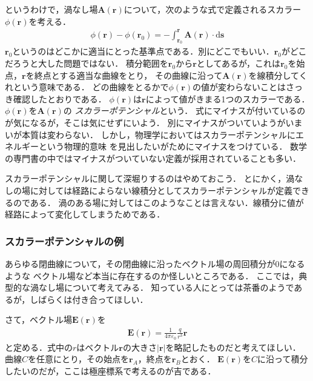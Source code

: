 というわけで，渦なし場$\bm{A}(\bm{r})$について，次のような式で定義されるスカラー$\phi(\bm{r})$を考える．
\begin{align}
\phi (\bm{r}) - \phi (\bm{r}_0 )= - \int_{\bm{r}_0}^{\bm{r}} \bm{A}(\bm{r}) \cdot \mathrm{d} \bm{s}
\label{eq:sukara}
\end{align}
$\bm{r}_0$というのはどこかに適当にとった基準点である．別にどこでもいい．$\bm{r}_0$がどこだろうと大した問題ではない．
積分範囲を$\bm{r}_0$から$\bm{r}$としてあるが，これは$\bm{r}_0$を始点，$\bm{r}$を終点とする適当な曲線をとり，
その曲線に沿って$\bm{A}(\bm{r})$を線積分してくれという意味である．
どの曲線をとるかで$\phi(\bm{r})$の値が変わらないことはさっき確認したとおりである．
$\phi(\bm{r})$は$\bm{r}$によって値がきまる1つのスカラーである．
$\phi(\bm{r})$を$\bm{A}(\bm{r})$の
\emph{スカラーポテンシャル}という．
式にマイナスが付いているのが気になるが，そこは気にせずにいよう．
別にマイナスがついていようがいまいが本質は変わらない．
しかし，物理学においてはスカラーポテンシャルにエネルギーという物理的意味
を見出したいがためにマイナスをつけている．
数学の専門書の中ではマイナスがついていない定義が採用されていることも多い．

スカラーポテンシャルに関して深堀りするのはやめておこう．
とにかく，渦なしの場に対しては経路によらない線積分としてスカラーポテンシャルが定義できるのである．
渦のある場に対してはこのようなことは言えない．線積分に値が経路によって変化してしまうためである．

\subsubsection{スカラーポテンシャルの例}
あらゆる閉曲線について，その閉曲線に沿ったベクトル場の周回積分が0になるような
ベクトル場など本当に存在するのか怪しいところである．
ここでは，典型的な渦なし場について考えてみる．
知っている人にとっては茶番のようであるが，しばらくは付き合ってほしい．

さて，ベクトル場$\bm{E}(\bm{r})$を
\begin{align}
\bm{E}(\bm{r}) = \frac{1}{4 \pi \varepsilon_0} \frac{q}{r^3} \bm{r}
\label{eq:seidenba}
\end{align}
と定める．式中の$r$はベクトル$\bm{r}$の大きさ$\lvert \bm{r} \rvert$を略記したものだと考えてほしい．
曲線$C$を任意にとり，その始点を$\bm{r}_A$，終点を$\bm{r}_B$とおく．
$\bm{E}(\bm{r})$を$C$に沿って積分したいのだが，ここは極座標系で考えるのが吉である．

